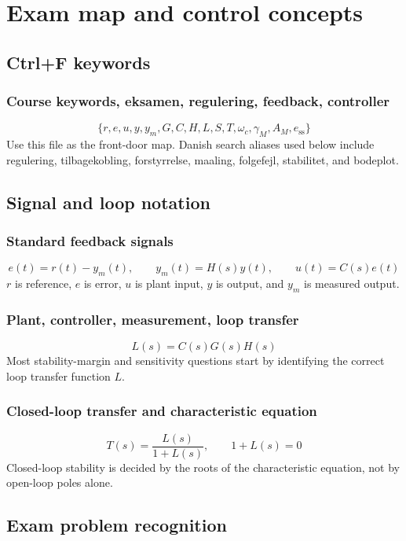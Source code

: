 \section{Exam map and control concepts}

\subsection{Ctrl+F keywords}

\subsubsection{Course keywords, eksamen, regulering, feedback, controller}
\[
\{r,e,u,y,y_m,G,C,H,L,S,T,\omega_c,\gamma_M,A_M,e_{\mathrm{ss}}\}
\]
Use this file as the front-door map. Danish search aliases used below include regulering, tilbagekobling, forstyrrelse, maaling, folgefejl, stabilitet, and bodeplot.

\subsection{Signal and loop notation}

\subsubsection{Standard feedback signals}
\[
e(t)=r(t)-y_m(t),\qquad y_m(t)=H(s)y(t),\qquad u(t)=C(s)e(t)
\]
\(r\) is reference, \(e\) is error, \(u\) is plant input, \(y\) is output, and \(y_m\) is measured output.

\subsubsection{Plant, controller, measurement, loop transfer}
\[
L(s)=C(s)G(s)H(s)
\]
Most stability-margin and sensitivity questions start by identifying the correct loop transfer function \(L\).

\subsubsection{Closed-loop transfer and characteristic equation}
\[
T(s)=\frac{L(s)}{1+L(s)},\qquad 1+L(s)=0
\]
Closed-loop stability is decided by the roots of the characteristic equation, not by open-loop poles alone.

\subsection{Exam problem recognition}

